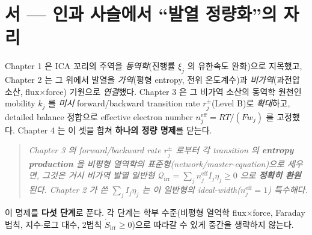 \documentclass[11pt,a4paper]{article}
\newcommand{\eff}{\mathrm{eff}}
\newcommand{\irr}{\mathrm{irr}}
\begin{document}
\section*{서 — 인과 사슬에서 ``발열 정량화''의 자리}
Chapter 1 은 ICA 꼬리의 주역을 \emph{동역학}(진행률 $\xi_j$ 의 유한속도 완화)으로 지목했고, Chapter 2 는 그
위에서 발열을 \emph{가역}(평형 entropy, 전위 온도계수)과 \emph{비가역}(과전압 소산, flux$\times$force) 기원으로
\emph{연결}했다. Chapter 3 은 그 비가역 소산의 동역학 원천인 mobility $k_j$ 를 \emph{미시} forward/backward
transition rate $r_j^\pm$(Level B)로 \emph{확대}하고, detailed balance 정합으로 effective electron number
$n_j^{\eff}=RT/(Fw_j)$ 를 고정했다. Chapter 4 는 이 셋을 합쳐 \textbf{하나의 정량 명제}를 닫는다.
\begin{quote}\itshape
Chapter 3 의 forward/backward rate $r_j^\pm$ 로부터 각 transition 의 \textbf{entropy production} 을 비평형
열역학의 표준형(network/master-equation)으로 세우면, 그것은 거시 비가역 발열 \emph{일반형}
$\dot{\mathcal Q}_\irr=\sum_j n_j^{\eff}I_j\eta_j\ge0$ 으로 \textbf{정확히 환원}된다. Chapter 2 가 쓴
$\sum_j I_j\eta_j$ 는 이 일반형의 ideal-width($n_j^{\eff}=1$) 특수해다.
\end{quote}
이 명제를 \textbf{다섯 단계}로 푼다. 각 단계는 학부 수준(비평형 열역학 flux$\times$force, Faraday 법칙,
지수$\cdot$로그 대수, 2법칙 $\dot S_\irr\ge0$)으로 따라갈 수 있게 중간을 생략하지 않는다.
\end{document}
